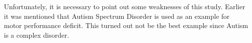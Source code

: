 Unfortunately, it is necessary to point out some weaknesses of this study.
Earlier it was mentioned that Autism Spectrum Disorder is used as an example for motor performance deficit. This turned out not be the best example since Autism is a complex disorder.











